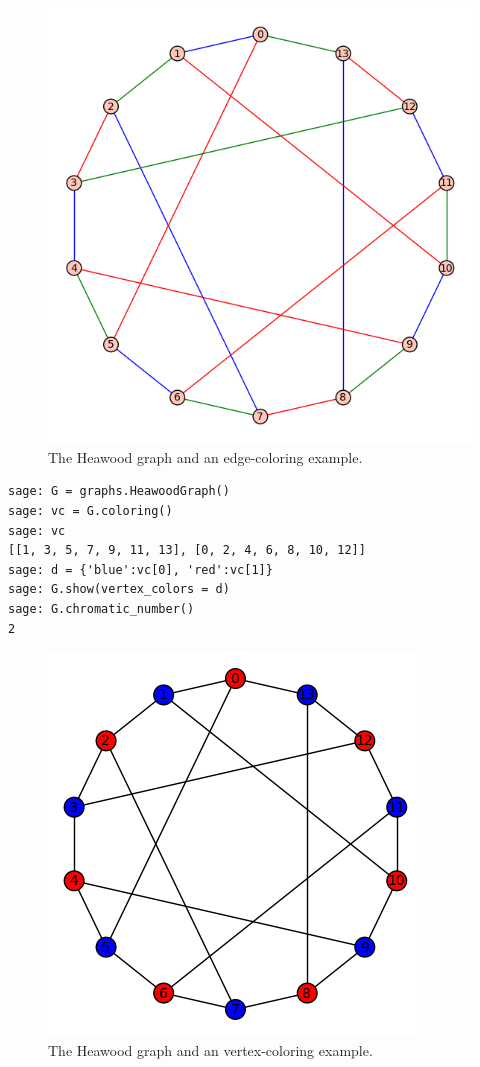 \begin{figure}[!htbp]
\centering
\includegraphics[scale=0.7]{image/graph-coloring/heawood-graph-edge-coloring-example}
\caption{The Heawood graph and an edge-coloring example.}
\label{fig:graph_coloring:heawood_graph_edge_coloring_example}
\end{figure}

\begin{lstlisting}
sage: G = graphs.HeawoodGraph()
sage: vc = G.coloring()
sage: vc
[[1, 3, 5, 7, 9, 11, 13], [0, 2, 4, 6, 8, 10, 12]]
sage: d = {'blue':vc[0], 'red':vc[1]}
sage: G.show(vertex_colors = d)
sage: G.chromatic_number()
2
\end{lstlisting}

\begin{figure}[!htbp]
\centering
{}
\includegraphics[scale=0.7]{image/graph-coloring/heawood-graph-vertex-coloring-example}
\caption{The Heawood graph and an vertex-coloring example.}
\label{fig:graph_coloring:heawood_graph_vertex_coloring_example}
\end{figure}

